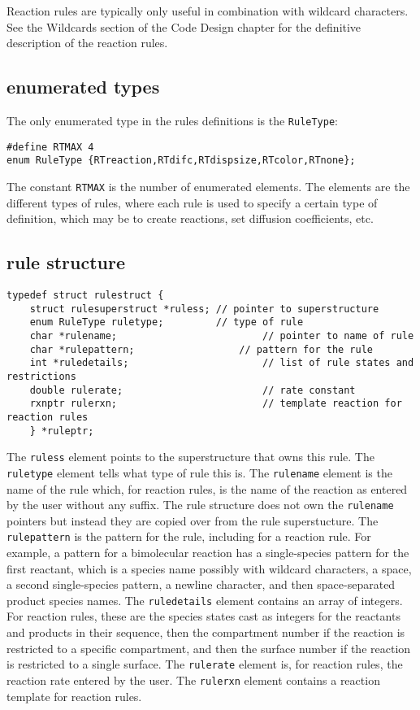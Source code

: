 \documentclass {book}
\begin{document}
Reaction rules are typically only useful in combination with wildcard characters. See the Wildcards section of the Code Design chapter for the definitive description of the reaction rules.

\subsection*{enumerated types}

The only enumerated type in the rules definitions is the \texttt{RuleType}:

\begin{lstlisting}
#define RTMAX 4
enum RuleType {RTreaction,RTdifc,RTdispsize,RTcolor,RTnone};
\end{lstlisting}

The constant \texttt{RTMAX} is the number of enumerated elements. The elements are the different types of rules, where each rule is used to specify a certain type of definition, which may be to create reactions, set diffusion coefficients, etc.

\subsection*{rule structure}

\begin{lstlisting}
typedef struct rulestruct {
	struct rulesuperstruct *ruless;	// pointer to superstructure
	enum RuleType ruletype;			// type of rule
	char *rulename;							// pointer to name of rule
	char *rulepattern;					// pattern for the rule
	int *ruledetails;						// list of rule states and restrictions
	double rulerate;						// rate constant
	rxnptr rulerxn;							// template reaction for reaction rules
	} *ruleptr;
\end{lstlisting}

The \texttt{ruless} element points to the superstructure that owns this rule. The \texttt{ruletype} element tells what type of rule this is. The \texttt{rulename} element is the name of the rule which, for reaction rules, is the name of the reaction as entered by the user without any suffix. The rule structure does not own the \texttt{rulename} pointers but instead they are copied over from the rule superstucture. The \texttt{rulepattern} is the pattern for the rule, including for a reaction rule. For example, a pattern for a bimolecular reaction has a single-species pattern for the first reactant, which is a species name possibly with wildcard characters, a space, a second single-species pattern, a newline character, and then space-separated product species names. The \texttt{ruledetails} element contains an array of integers. For reaction rules, these are the species states cast as integers for the reactants and products in their sequence, then the compartment number if the reaction is restricted to a specific compartment, and then the surface number if the reaction is restricted to a single surface. The \texttt{rulerate} element is, for reaction rules, the reaction rate entered by the user. The \texttt{rulerxn} element contains a reaction template for reaction rules.
\end{document}
